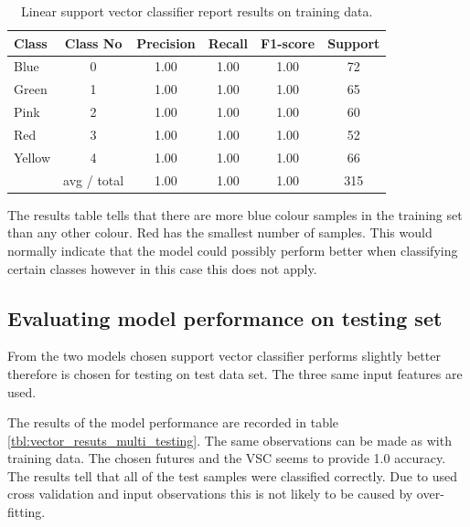 \documentclass[11pt]{article}
\begin{document}
			\begin{center}
			  	\begin{table}[h]
			  	\centering
				\begin{tabular}[b]{| l | c | c | c | c | c |}
					\hline
					Class & Class No & Precision &  Recall & F1-score & Support  \\
		 			\hline
					Blue & 0  &   1.00   &   1.00   &   1.00   &   72 \\
          			Green & 1  &   1.00   &   1.00   &   1.00   &    65 \\
         			Pink & 2  &   1.00   &   1.00   &   1.00   &     60 \\
          			Red & 3  &   1.00   &   1.00   &   1.00   &     52 \\
          			Yellow & 4  &   1.00   &   1.00   &   1.00   &     66 \\
          			\hline
					 & avg / total   &   1.00   &   1.00   &   1.00  &      315 \\
					\hline
				\end{tabular}
				\caption{Linear support vector classifier report results on training data.}
				\label{tbl:vector_resuts_multi}
				\end{table}
			\end{center}
			\vspace*{-1.3cm}

 			 The results table tells that there are more blue colour samples in the training set than any other colour. Red has the smallest number of samples. This would normally indicate that the model could possibly perform better when classifying certain classes however in this case this does not apply.

		\subsection{Evaluating model performance on testing set}

			From the two models chosen support vector classifier performs slightly better therefore is chosen for testing on test data set. The three same input features are used.

			The results of the model performance are recorded in table \ref{tbl:vector_resuts_multi_testing}. The same observations can be made as with training data. The chosen futures and the VSC seems to provide 1.0 accuracy. The results tell that all of the test samples were classified correctly. Due to used cross validation and input observations this is not likely to be caused by over-fitting. 
\end{document}
